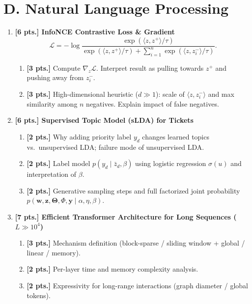 \documentclass[11pt,a4paper]{article}
\begin{document}
\section*{D. Natural Language Processing}

\begin{enumerate}[label=\textbf{(\arabic*)}]
    \item \textbf{[6 pts.] InfoNCE Contrastive Loss \& Gradient}
    \[
    \mathcal{L} = -\log \frac{\exp(\langle z, z^+ \rangle / \tau)}{\exp(\langle z, z^+ \rangle / \tau) + \sum_{i=1}^n \exp(\langle z, z_i^- \rangle / \tau)}.
    \]
    \begin{enumerate}[label=(\a*)]
        \item \textbf{[3 pts.]} Compute $\nabla_z \mathcal{L}$. Interpret result as pulling towards $z^+$ and pushing away from $z_i^-$.
        \item \textbf{[3 pts.]} High-dimensional heuristic ($d \gg 1$): scale of $\langle z, z_i^- \rangle$ and max similarity among $n$ negatives. Explain impact of false negatives.
    \end{enumerate}

    \item \textbf{[6 pts.] Supervised Topic Model (sLDA) for Tickets}
    \begin{enumerate}[label=(\a*)]
        \item \textbf{[2 pts.]} Why adding priority label $y_d$ changes learned topics vs.\ unsupervised LDA; failure mode of unsupervised LDA.
        \item \textbf{[2 pts.]} Label model $p(y_d \mid \bar{z}_d, \beta)$ using logistic regression $\sigma(u)$ and interpretation of $\beta$.
        \item \textbf{[2 pts.]} Generative sampling steps and full factorized joint probability $p(\mathbf{w}, \mathbf{z}, \bm{\Theta}, \Phi, \mathbf{y} \mid \alpha, \eta, \beta)$.
    \end{enumerate}

    \item \textbf{[7 pts.] Efficient Transformer Architecture for Long Sequences ($L \gg 10^4$)}
    \begin{enumerate}[label=(\a*)]
        \item \textbf{[3 pts.]} Mechanism definition (block-sparse / sliding window + global / linear / memory).
        \item \textbf{[2 pts.]} Per-layer time and memory complexity analysis.
        \item \textbf{[2 pts.]} Expressivity for long-range interactions (graph diameter / global tokens).
    \end{enumerate}


\end{enumerate}
\end{document}
